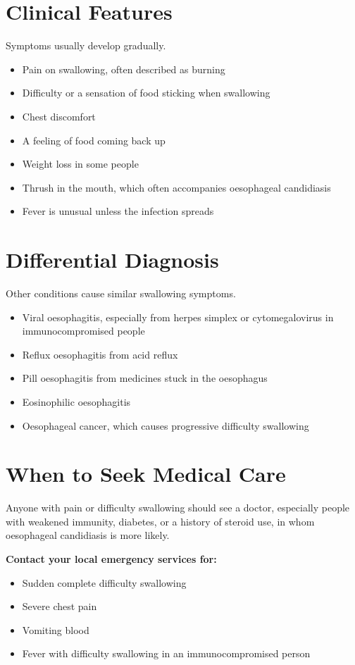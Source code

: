 \section*{Clinical Features}
Symptoms usually develop gradually.
\begin{itemize}
    \item Pain on swallowing, often described as burning
    \item Difficulty or a sensation of food sticking when swallowing
    \item Chest discomfort
    \item A feeling of food coming back up
    \item Weight loss in some people
    \item Thrush in the mouth, which often accompanies oesophageal candidiasis
    \item Fever is unusual unless the infection spreads
\end{itemize}

\section*{Differential Diagnosis}
Other conditions cause similar swallowing symptoms.
\begin{itemize}
    \item Viral oesophagitis, especially from herpes simplex or cytomegalovirus in immunocompromised people
    \item Reflux oesophagitis from acid reflux
    \item Pill oesophagitis from medicines stuck in the oesophagus
    \item Eosinophilic oesophagitis
    \item Oesophageal cancer, which causes progressive difficulty swallowing
\end{itemize}

\section*{When to Seek Medical Care}
Anyone with pain or difficulty swallowing should see a doctor, especially people with weakened immunity, diabetes, or a history of steroid use, in whom oesophageal candidiasis is more likely.

\textbf{Contact your local emergency services for:}
\begin{itemize}
    \item Sudden complete difficulty swallowing
    \item Severe chest pain
    \item Vomiting blood
    \item Fever with difficulty swallowing in an immunocompromised person
\end{itemize}

